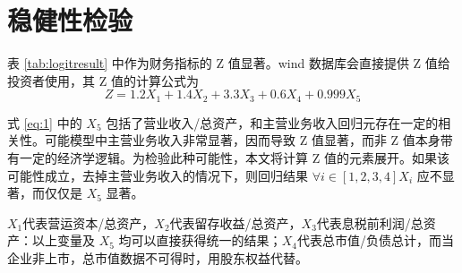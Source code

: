 \section{稳健性检验}
表 \ref{tab:logitresult} 中作为财务指标的 Z 值显著。wind 数据库会直接提供 Z 值给投资者使用，其 Z 值的计算公式为
\begin{equation}
	\label{eq:1}
	Z=1.2X_1+1.4X_2+3.3X_3+0.6X_4+0.999X_5
\end{equation}

式 \ref{eq:1} 中的 \(X_{5}\) 包括了营业收入/总资产，和主营业务收入回归元存在一定的相关性。可能模型中主营业务收入非常显著，因而导致 Z 值显著，而非 Z 值本身带有一定的经济学逻辑。为检验此种可能性，本文将计算 Z 值的元素展开。如果该可能性成立，去掉主营业务收入的情况下，则回归结果 \(\forall i\in [1,2,3,4] X_i\) 应不显著，而仅仅是 \(X_5\) 显著。

\(X_1\)代表营运资本/总资产，\(X_2\)代表留存收益/总资产，\(X_3\)代表息税前利润/总资产：以上变量及 \(X_5\) 均可以直接获得统一的结果；\(X_4\)代表总市值/负债总计，而当企业非上市，总市值数据不可得时，用股东权益代替。

